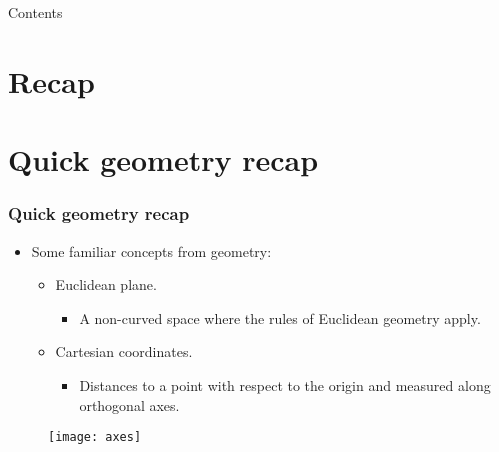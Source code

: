 
\usepackage{listings}


\subtitle{Image Formation\\Part II} %





\begin{frame}
\titlepage %
\end{frame}

\begin{frame}{Contents}
\setcounter{tocdepth}{1}
\tableofcontents
\end{frame}


\section{Recap}

\section{Quick geometry recap}

\begin{frame}
\frametitle{Quick geometry recap}
\begin{itemize}
\item Some familiar concepts from geometry:
\begin{itemize}
\item Euclidean plane.
\begin{itemize}
\item A non-curved space where the rules of Euclidean geometry apply.
\end{itemize}
\item Cartesian coordinates.
\begin{itemize}
\item Distances to a point with respect to the origin and measured along orthogonal axes.
\end{itemize}
\end{itemize}
\end{itemize}
\begin{figure}[!h]
\centering
\texttt{[image: axes]}
\end{figure}
\end{frame}

